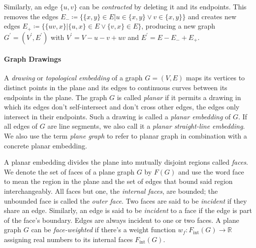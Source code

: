 \begin{definition}
	Similarly, an edge $\{u,v\}$ can be \emph{contracted} by deleting it and  its endpoints.
	This removes the edges $E_- \coloneqq \{ \{x,y\} \in E \vert u \in \{x,y\} \lor v \in \{x,y\} \}$ and creates new edges $E_+ \coloneqq \{ \{uv,x\} \vert \{u,x\} \in E \lor \{v,x\} \in E \}$, producing a new graph $G^\prime = (V^\prime, E^\prime)$ with $V^\prime = V - u - v + uv$ and $E^\prime = E - E_- + E_+$.
\end{definition}



\paragraph{Graph Drawings}

\begin{definition}
	A \emph{drawing} or \emph{topological embedding} of a graph $G = (V, E)$ maps its vertices to distinct points in the plane and its edges to continuous curves between its endpoints in the plane.
	The graph $G$ is called \emph{planar} if it permits a drawing in which its edges don't self-intersect and don't cross other edges, \ie{} the edges only intersect in their endpoints.
	Such a drawing is called a \emph{planar embedding} of $G$. If all edges of $G$ are line segments, we also call it a \emph{planar straight-line embedding}.
	We also use the term \emph{plane graph} to refer to planar graph in combination with a concrete planar embedding.
\end{definition}

\begin{definition}
	A planar embedding divides the plane into mutually disjoint regions called \emph{faces}. We denote the set of faces of a plane graph $G$ by $F(G)$ and use the word face to mean the region in the plane and the set of edges that bound said region interchangeably.
	All faces but one, the \emph{internal faces}, are bounded; the unbounded face is called the \emph{outer face}.
	Two faces are said to be \emph{incident} if they share an edge.
	Similarly, an edge is said to be \emph{incident} to a face if the edge is part of the face's boundary. Edges are always incident to one or two faces.
	A plane graph $G$ can be \emph{face-weighted} if there's a weight function $w_f \colon F_\text{int}(G) \to \mathbb{R}$ assigning real numbers to its internal faces $F_\text{int}(G)$.
\end{definition}


